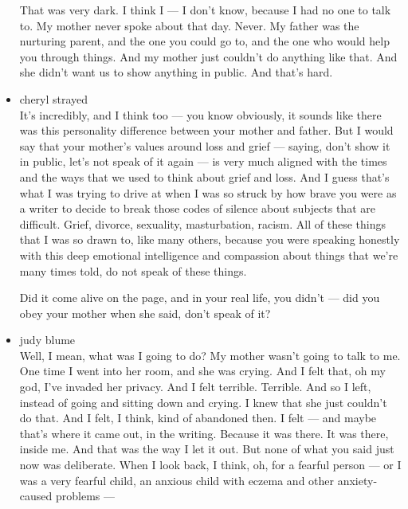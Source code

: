 \begin{itemize}
  That was very dark. I think I --- I don't know, because I had no one
  to talk to. My mother never spoke about that day. Never. My father was
  the nurturing parent, and the one you could go to, and the one who
  would help you through things. And my mother just couldn't do anything
  like that. And she didn't want us to show anything in public. And
  that's hard.
\item
  cheryl strayed\\
  It's incredibly, and I think too --- you know obviously, it sounds
  like there was this personality difference between your mother and
  father. But I would say that your mother's values around loss and
  grief --- saying, don't show it in public, let's not speak of it again
  --- is very much aligned with the times and the ways that we used to
  think about grief and loss. And I guess that's what I was trying to
  drive at when I was so struck by how brave you were as a writer to
  decide to break those codes of silence about subjects that are
  difficult. Grief, divorce, sexuality, masturbation, racism. All of
  these things that I was so drawn to, like many others, because you
  were speaking honestly with this deep emotional intelligence and
  compassion about things that we're many times told, do not speak of
  these things.

  Did it come alive on the page, and in your real life, you didn't ---
  did you obey your mother when she said, don't speak of it?
\item
  judy blume\\
  Well, I mean, what was I going to do? My mother wasn't going to talk
  to me. One time I went into her room, and she was crying. And I felt
  that, oh my god, I've invaded her privacy. And I felt terrible.
  Terrible. And so I left, instead of going and sitting down and crying.
  I knew that she just couldn't do that. And I felt, I think, kind of
  abandoned then. I felt --- and maybe that's where it came out, in the
  writing. Because it was there. It was there, inside me. And that was
  the way I let it out. But none of what you said just now was
  deliberate. When I look back, I think, oh, for a fearful person --- or
  I was a very fearful child, an anxious child with eczema and other
  anxiety-caused problems ---


\end{itemize}
